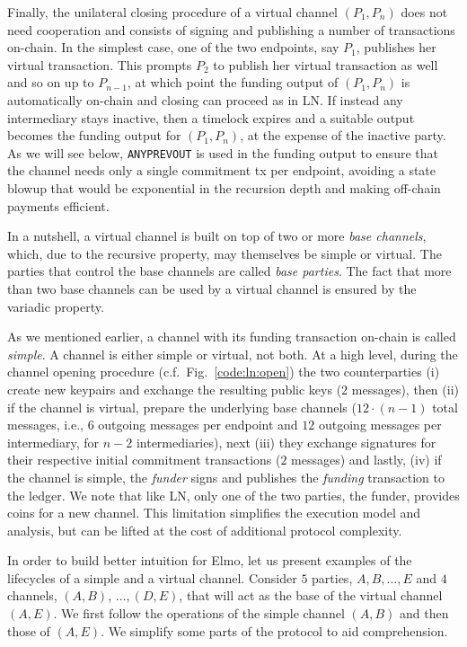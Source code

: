   Finally, the unilateral closing procedure of a virtual channel $(P_1, P_n)$
  does not need cooperation and consists of signing and publishing a number of
  transactions on-chain. In the simplest case, one of the two endpoints, say
  $P_1$, publishes her virtual transaction. This prompts $P_2$ to publish her
  virtual transaction as well and so on up to $P_{n-1}$, at which point the
  funding output of $(P_1, P_n)$ is automatically on-chain and closing can
  proceed as in LN. If instead any intermediary stays inactive, then a timelock
  expires and a suitable output becomes the funding output for $(P_1, P_n)$, at
  the expense of the inactive party. As we will see below, \texttt{ANYPREVOUT} is
  used in the funding output to ensure that the channel needs only a
  single commitment tx per endpoint, avoiding a state blowup that would be
  exponential in the recursion depth and making off-chain payments efficient.

  In a nutshell, a virtual channel is built on top of two or more \emph{base
  channels}, which, due to the recursive property, may themselves be simple or
  virtual. The parties that control the base channels are called \emph{base
  parties}. The fact that more than two base channels can be used by a
  virtual channel is ensured by the variadic property.

  As we mentioned earlier, a channel with its funding transaction on-chain is
  called \emph{simple}. A channel is either simple or virtual, not both. At a
  high level, during the channel opening procedure (c.f.\
  Fig.~\ref{code:ln:open}) the two counterparties (i) create new keypairs and
  exchange the resulting public keys ($2$ messages), then (ii) if the channel is
  virtual, prepare the underlying base channels ($12 \cdot (n-1)$ total
  messages, i.e., $6$ outgoing messages per endpoint and $12$ outgoing messages
  per intermediary, for $n-2$ intermediaries), next (iii) they exchange
  signatures for their respective initial commitment transactions ($2$ messages)
  and lastly, (iv) if the channel is simple, the \emph{funder} signs and
  publishes the \emph{funding} transaction to the ledger. We note that like LN,
  only one of the two parties, the funder, provides coins for a new channel.
  This limitation simplifies the execution model and analysis, but can be lifted
  at the cost of additional protocol complexity.

  In order to build better intuition for Elmo, let us present examples of the
  lifecycles of a simple and a virtual channel. Consider $5$ parties, $A, B,
  \dots, E$ and $4$ channels, $(A, B)$, $\dots,(D, E)$, that will act as
  the base of the virtual channel $(A, E)$. We first follow the operations of
  the simple channel $(A, B)$ and then those of $(A, E)$. We simplify some parts
  of the protocol to aid comprehension.

